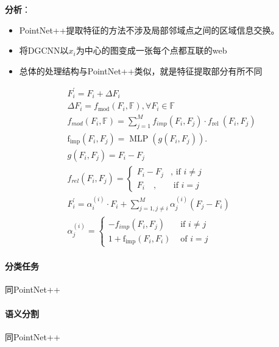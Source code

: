 \documentclass[a4paper,12pt]{article}
\begin{document}
\textbf{分析}：
\begin{itemize}
	\item PointNet++提取特征的方法不涉及局部邻域点之间的区域信息交换。
	\item 将DGCNN以$x_i$为中心的图变成一张每个点都互联的web
	\item 总体的处理结构与PointNet++类似，就是特征提取部分有所不同
\end{itemize}
$$
\begin{aligned}
	&F_{i}^{\prime}=F_{i}+\Delta F_{i}\\
	&\Delta F_{i}=f_{\operatorname{mod}}\left(F_{i}, \mathbb{F}\right), \forall F_{i} \in \mathbb{F}\\
	&f_{m o d}\left(F_{i}, \mathbb{F}\right)=\sum_{j=1}^{M} f_{i m p}\left(F_{i}, F_{j}\right) \cdot f_{\text {rel }}\left(F_{i}, F_{j}\right)\\
	&\operatorname{f_{imp}}\left(F_{i}, F_{j}\right)=\operatorname{MLP}\left(g\left(F_{i}, F_{j}\right)\right) \text {. }\\
	&g\left(F_{i}, F_{j}\right)=F_{i}-F_{j}\\
	&f_{rel}\left(F_{i}, F_{j}\right)= \begin{cases}F_{i}-F_{j} & \text {, if } i \neq j \\ F_{i} \quad, & \text { if } i=j\end{cases}\\
	&F_{i}^{\prime}=\alpha_{i}^{(i)} \cdot F_{i}+\sum_{j=1, j \neq i}^{M} \alpha_{j}^{(i)}\left(F_{j}-F_{i}\right)\\
	&\alpha_{j}^{(i)}= \begin{cases}-f_{i m p}\left(F_{i}, F_{j}\right) & \text { if } i \neq j \\ 1+\operatorname{f_{i m p}}\left(F_{i}, F_{i}\right) & \text { of } i=j\end{cases}
\end{aligned}
$$

\paragraph{分类任务}
同PointNet++
\paragraph{语义分割} 同PointNet++
\end{document}
